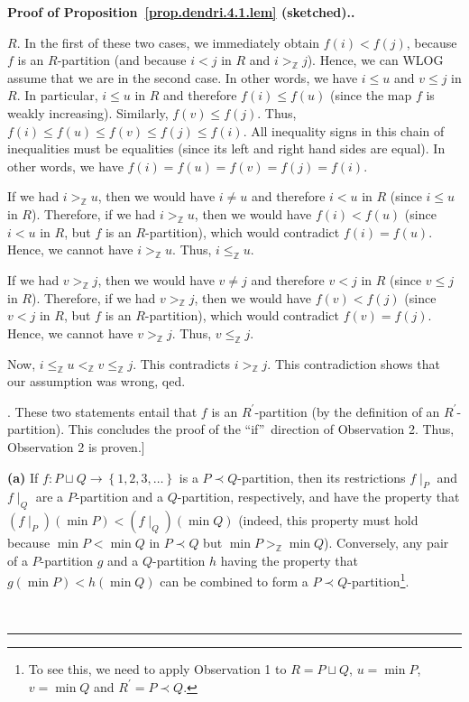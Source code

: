 \documentclass[numbers=enddot,12pt,final,onecolumn,notitlepage]{scrartcl}%
\theoremstyle{definition}
\newenvironment{proof}[1][Proof]{\noindent\textbf{#1.} }{\ \rule{0.5em}{0.5em}}
\newenvironment{verlong}{}{}
\newcommand{\ZZ}{\mathbb{Z}}
\begin{document}
\begin{verlong}
\begin{proof}[Proof of Proposition~\ref{prop.dendri.4.1.lem} (sketched).]
{$R$. In the first of these two cases, we immediately obtain $f\left(
i\right)  <f\left(  j\right)  $, because $f$ is an $R$-partition (and because
$i<j$ in $R$ and $i>_{\mathbb{Z}}j$). Hence, we can WLOG assume that we are in
the second case. In other words, we have $i\leq u$ and $v\leq j$ in $R$. In
particular, $i\leq u$ in $R$ and therefore $f\left(  i\right)  \leq f\left(
u\right)  $ (since the map $f$ is weakly increasing). Similarly, $f\left(
v\right)  \leq f\left(  j\right)  $. Thus, $f\left(  i\right)  \leq f\left(
u\right)  \leq f\left(  v\right)  \leq f\left(  j\right)  \leq f\left(
i\right)  $. All inequality signs in this chain of inequalities must be
equalities (since its left and right hand sides are equal). In other words, we
have $f\left(  i\right)  =f\left(  u\right)  =f\left(  v\right)  =f\left(
j\right)  =f\left(  i\right)  $.
\par
If we had $i>_{\mathbb{Z}}u$, then we would have $i\neq u$ and therefore $i<u$
in $R$ (since $i\leq u$ in $R$). Therefore, if we had $i>_{\mathbb{Z}}u$, then
we would have $f\left(  i\right)  <f\left(  u\right)  $ (since $i<u$ in $R$,
but $f$ is an $R$-partition), which would contradict $f\left(  i\right)
=f\left(  u\right)  $. Hence, we cannot have $i>_{\mathbb{Z}}u$. Thus,
$i\leq_{\mathbb{Z}}u$.
\par
If we had $v>_{\mathbb{Z}}j$, then we would have $v\neq j$ and therefore $v<j$
in $R$ (since $v\leq j$ in $R$). Therefore, if we had $v>_{\mathbb{Z}}j$, then
we would have $f\left(  v\right)  <f\left(  j\right)  $ (since $v<j$ in $R$,
but $f$ is an $R$-partition), which would contradict $f\left(  v\right)
=f\left(  j\right)  $. Hence, we cannot have $v>_{\mathbb{Z}}j$. Thus,
$v\leq_{\mathbb{Z}}j$.
\par
Now, $i\leq_{\mathbb{Z}}u<_{\mathbb{Z}}v\leq_{\mathbb{Z}}j$. This contradicts
$i>_{\mathbb{Z}}j$. This contradiction shows that our assumption was wrong,
qed.}. These two statements entail that $f$ is an $R^{\prime}$-partition (by
the definition of an $R^{\prime}$-partition). This concludes the proof of the
\textquotedblleft if\textquotedblright\ direction of Observation 2. Thus,
Observation 2 is proven.]

\textbf{(a)} If $f : P \sqcup Q \to \left\{1,2,3,\ldots\right\}$ is a
$P \left. \prec \right. Q$-partition, then its restrictions $f\mid_P$
and $f\mid_Q$ are a $P$-partition and a $Q$-partition, respectively, and
have the property that
$\left(f\mid_P\right) \left( \min P \right) < \left(f\mid_Q\right) \left( \min Q \right)$
(indeed, this property must hold because $\min P < \min Q$ in
$P \left. \prec \right. Q$ but $\min P >_{\ZZ} \min Q$).
Conversely, any pair of a $P$-partition $g$ and a $Q$-partition $h$
having the property that $g \left(\min P\right) < h \left(\min Q\right)$
can be combined to form a
$P \left. \prec \right. Q$-partition\footnote{To see this, we need to
apply Observation 1 to $R = P \sqcup Q$, $u = \min P$, $v = \min Q$
and $R^{\prime} = P \left. \prec \right. Q$.}.


\end{proof}
\end{verlong}
\end{document}
